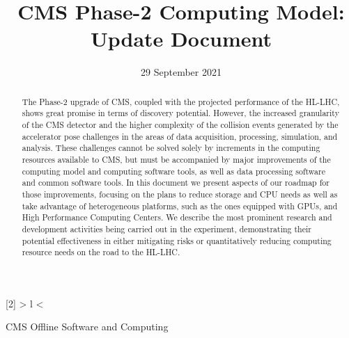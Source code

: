 \documentclass{cmspaper}
\begin{document}
\newcolumntype{R}[2]{%
    >{\bgroup}%
    l%
    <{\egroup}%
}
\newcommand*\rot{\multicolumn{1}{R{90}{1em}}}

\begin{titlepage}


\date{29 September 2021}
\title{CMS Phase-2 Computing Model:\\ Update Document}
\begin{Authlist}
CMS Offline Software and Computing
\end{Authlist}
\vspace{0.1cm}



\begin{abstract}


The Phase-2 upgrade of CMS, coupled with the projected performance of the HL-LHC, shows great promise in terms of discovery potential. However, the increased granularity of the CMS detector and the higher complexity of the collision events generated by the accelerator pose challenges in the areas of data acquisition, processing, simulation, and analysis. These challenges cannot be solved solely by increments in the computing resources available to CMS, but must be accompanied by major improvements of the computing model and computing software tools, as well as data processing software and common software tools. In this document we present aspects of our roadmap for those improvements, focusing on the plans to reduce storage and CPU needs as well as take advantage of heterogeneous platforms, such as the ones equipped with GPUs, and High Performance Computing Centers. We describe the most prominent research and development activities being carried out in the experiment, demonstrating their potential effectiveness in either mitigating risks or quantitatively reducing computing resource needs on the road to the HL-LHC.


\end{abstract}
\end{titlepage}
\end{document}
